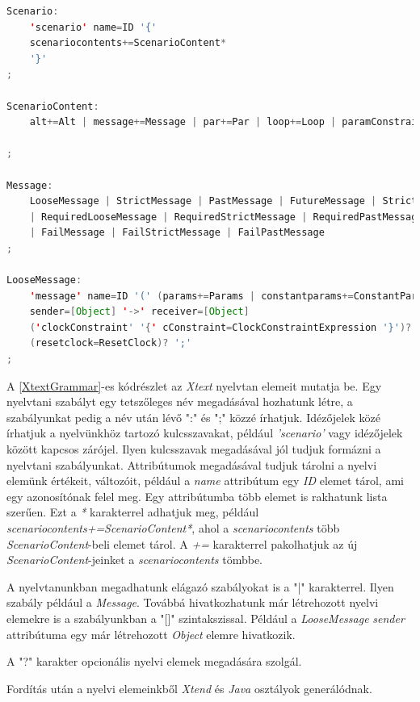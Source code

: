 \begin{lstlisting}[language=java, frame=single, float=ht!, caption={Xtext nyelvtan elemei.},captionpos=b, label=XtextGrammar]
Scenario:
	'scenario' name=ID '{'
	scenariocontents+=ScenarioContent*
	'}'
;

ScenarioContent:
	alt+=Alt | message+=Message | par+=Par | loop+=Loop | paramConstraint+=ParameterConstraint

;

Message:
	LooseMessage | StrictMessage | PastMessage | FutureMessage | StrictFutureMessage
	| RequiredLooseMessage | RequiredStrictMessage | RequiredPastMessage | RequiredFutureMessage | RequiredStrictFutureMessage
	| FailMessage | FailStrictMessage | FailPastMessage
;

LooseMessage:
	'message' name=ID '(' (params+=Params | constantparams+=ConstantParams) ')'
	sender=[Object] '->' receiver=[Object]
	('clockConstraint' '{' cConstraint=ClockConstraintExpression '}')? 
	(resetclock=ResetClock)? ';'
;
\end{lstlisting}

A \ref{XtextGrammar}-es kódrészlet az \textit{Xtext} nyelvtan elemeit mutatja be.
Egy nyelvtani szabályt egy tetszőleges név megadásával hozhatunk létre, a szabályunkat pedig a név után lévő ":" és ";" közzé írhatjuk.
Idézőjelek közé írhatjuk a nyelvünkhöz tartozó kulcsszavakat, például \textit{'scenario'} vagy idézőjelek között kapcsos zárójel.
Ilyen kulcsszavak megadásával jól tudjuk formázni a nyelvtani szabályunkat.
Attribútumok megadásával tudjuk tárolni a nyelvi elemünk értékeit, változóit, például a \textit{name} attribútum egy \textit{ID} elemet tárol, ami egy azonosítónak felel meg.
Egy attribútumba több elemet is rakhatunk lista szerűen.
Ezt a \textit{*} karakterrel adhatjuk meg, például \textit{scenariocontents+=ScenarioContent*}, ahol a \textit{scenariocontents} több \textit{ScenarioContent}-beli elemet tárol.
A \textit{+=} karakterrel pakolhatjuk az új \textit{ScenarioContent}-jeinket a \textit{scenariocontents} tömbbe.

A nyelvtanunkban megadhatunk elágazó szabályokat is a "|" karakterrel.
Ilyen szabály például a \textit{Message}.
Továbbá hivatkozhatunk már létrehozott nyelvi elemekre is a szabályunkban a "[]" szintakszissal.
Például a \textit{LooseMessage} \textit{sender} attribútuma egy már létrehozott \textit{Object} elemre hivatkozik.

A "?" karakter opcionális nyelvi elemek megadására szolgál.

Fordítás után a nyelvi elemeinkből \textit{Xtend} és \textit{Java} osztályok generálódnak.

